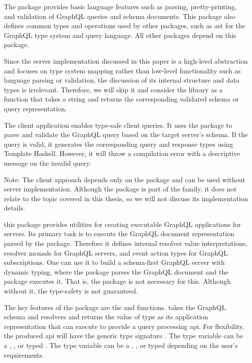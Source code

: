 \begin{enumerate} 
   The package provides basic language features such as parsing, pretty-printing, and validation of GraphQL queries and schema documents. This package also defines common types and operations used by other packages, such as \gls{ast} for the GraphQL type system and query language. All other packages depend on this package.

    Since the server implementation discussed in this paper is a high-level abstraction and focuses on type system mapping rather than low-level functionality such as language parsing or validation, the discussion of its internal structure and data types is irrelevant. Therefore, we will skip it and consider the library as a function that takes a string and returns the corresponding validated schema or query representation.

   The client application enables type-safe client queries. It uses the \corePackage package to parse and validate the GraphQL query based on the target server's schema. 
  If the query is valid, it generates the corresponding query and response types using Template Haskell. However, it will throw a compilation error with a   descriptive message on the invalid query.
    
  Note: The client approach depends only on the \corePackage package and can be used without server implementation. Although the package is part of the \Morpheus{} family, it does not relate to the topic covered in this thesis, so we will not discuss its implementation details.

  this package provides utilities for creating executable GraphQL 
  applications for servers.  Its primary task is to execute the 
  GraphQL document representation parsed by the \corePackage package. 
  Therefore it defines internal resolver value interpretations, resolver monads for GraphQL servers, and event action types for GraphQL 
  subscriptions. One can use it to build a schema-first 
   GraphQL server 
  with dynamic typing, where the \corePackage package parses 
  the GraphQL document and the \appPackage package executes it. 
  That is, the \serverPackage package is not necessary for this. 
  Although without it, the type-safety is not guaranteed. 
  
  The key features of the package are the  
  and  functions.
   takes the GraphQL schema and resolvers and 
  returns the value of type  as its application
  representation that  can execute to provide a query 
  processing \gls{api}. For flexibility, the produced \gls{api} will 
  have the generic type signature . The type 
  variable  can be a , , 
  or typed . The 
  type variable  can be a , , 
  or typed  depending on the user's requirements. 


\end{enumerate}
